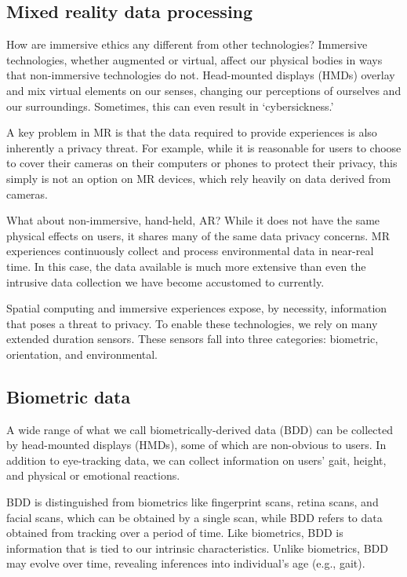 \subsection{Mixed reality data processing}\label{sec:data}

How are immersive ethics any different from other technologies? Immersive technologies, whether augmented or virtual, affect our physical bodies in ways that non-immersive technologies do not. Head-mounted displays (HMDs) overlay and mix virtual elements on our senses, changing our perceptions of ourselves and our surroundings. Sometimes, this can even result in `cybersickness.'

A key problem in MR is that the data required to provide experiences is also inherently a privacy threat. For example, while it is reasonable for users to choose to cover their cameras on their computers or phones to protect their privacy, this simply is not an option on MR devices, which rely heavily on data derived from cameras.

What about non-immersive, hand-held, AR? While it does not have the same physical effects on users, it shares many of the same data privacy concerns. MR experiences continuously collect and process environmental data in near-real time. In this case, the data available is much more extensive than even the intrusive data collection we have become accustomed to currently.

Spatial computing and immersive experiences expose, by necessity, information that poses a threat to privacy. To enable these technologies, we rely on many extended duration sensors. These sensors fall into three categories: biometric, orientation, and environmental.

\subsection{Biometric data}\label{sec:biometrics}
A wide range of what we call biometrically-derived data (BDD) can be collected by head-mounted displays (HMDs), some of which are non-obvious to users. In addition to eye-tracking data, we can collect information on users' gait, height, and physical or emotional reactions.

BDD is distinguished from biometrics like fingerprint scans, retina scans, and facial scans, which can be obtained by a single scan, while BDD refers to data obtained from tracking over a period of time. Like biometrics, BDD is information that is tied to our intrinsic characteristics. Unlike biometrics, BDD may evolve over time, revealing inferences into individual's age (e.g., gait).

